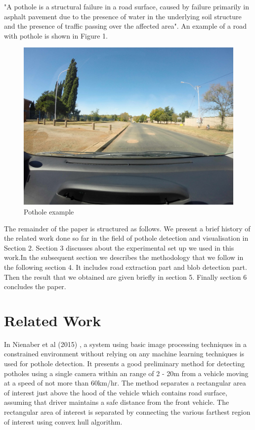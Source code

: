 \documentclass[journal]{IEEEtran}
\begin{document}
"A pothole \cite{pothole} is a structural failure in a road surface, caused by failure primarily in asphalt pavement due to the presence of water in the underlying soil structure and the presence of traffic passing over the affected area". An example of a road with pothole is shown in Figure 1.

\begin{figure}[!h]
\begin{center}
\includegraphics[scale=0.065]{Images/pothole_example.JPG}
\end{center}
\caption{Pothole example}
\end{figure}

The remainder of the paper is structured as follows. We present a brief history of the related work done so far in the field of pothole detection and visualisation in Section 2. Section 3 discusses about the experimental set up we used in this work.In the subsequent section we describes the methodology that we follow in the following section 4. It includes road extraction part and blob detection part. Then the result that we obtained are given briefly in section 5. Finally section 6 concludes the paper.

\section{Related Work}
In Nienaber et al (2015) \cite{paperone}, a system using basic image processing techniques in a constrained environment without relying on any machine learning techniques is used for pothole detection. It presents a good preliminary method for detecting potholes using a single camera within an range of 2 - 20m from a vehicle moving at a speed of not more than 60km/hr. The method separates a rectangular area of interest just above the hood of the vehicle which contains road surface, assuming that driver maintains a safe distance from the front vehicle. The rectangular area of interest is separated by connecting the various farthest region of interest using convex hull algorithm.
\end{document}
